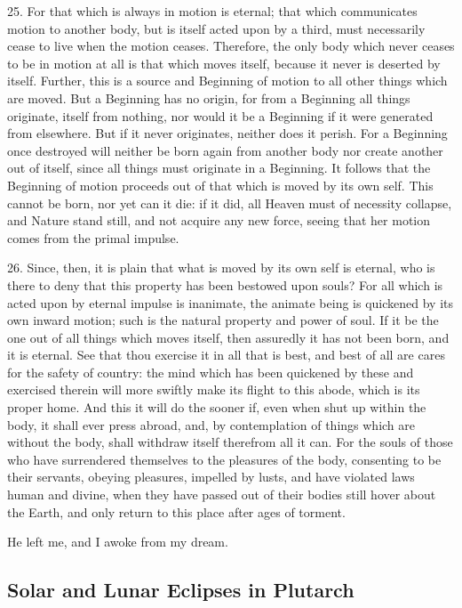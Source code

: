 \documentclass[a4paper, 11pt, oneside, polutonikogreek, english]{article}
\begin{document}
25. For that which is always in motion is eternal; that which communicates motion to another body, but is itself acted upon by a third, must necessarily cease to live when the motion ceases. Therefore, the only body which never ceases to be in motion at all is that which moves itself, because it never is deserted by itself. Further, this is a source and Beginning of motion to all other things which are moved. But a Beginning has no origin, for from a Beginning all things originate, itself from nothing, nor would it be a Beginning if it were generated from elsewhere. But if it never originates, neither does it perish. For a Beginning once destroyed will neither be born again from another body nor create another out of itself, since all things must originate in a Beginning. It follows that the Beginning of motion proceeds out of that which is moved by its own self. This cannot be born, nor yet can it die: if it did, all Heaven must of necessity collapse, and Nature stand still, and not acquire any new force, seeing that her motion comes from the primal impulse.

26. Since, then, it is plain that what is moved by its own self is eternal, who is there to deny that this property has been bestowed upon souls? For all which is acted upon by eternal impulse is inanimate, the animate being is quickened by its own inward motion; such is the natural property and power of soul. If it be the one out of all things which moves itself, then assuredly it has not been born, and it is eternal. See that thou exercise it in all that is best, and best of all are cares for the safety of country: the mind which has been quickened by these and exercised therein will more swiftly make its flight to this abode, which is its proper home. And this it will do the sooner if, even when shut up within the body, it shall ever press abroad, and, by contemplation of things which are without the body, shall withdraw itself therefrom all it can. For the souls of those who have surrendered themselves to the pleasures of the body, consenting to be their servants, obeying pleasures, impelled by lusts, and have violated laws human and divine, when they have passed out of their bodies still hover about the Earth, and only return to this place after ages of torment.

He left me, and I awoke from my dream.

\subsection{Solar and Lunar Eclipses in Plutarch}
\end{document}
